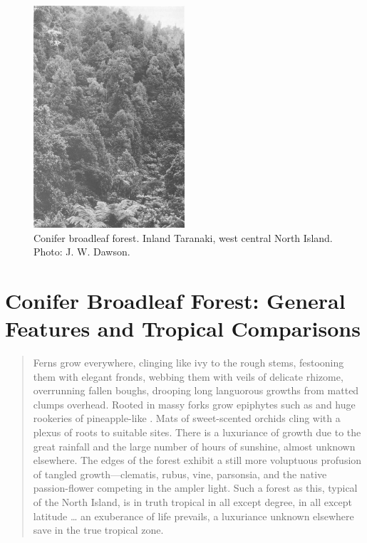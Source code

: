 \begin{figure}
	\includegraphics[width=0.5\textwidth]{graphics/figure6conifer-broadleaf.jpg}
	\centering
	\caption[Conifer broadleaf forest, inland Taranaki]{Conifer broadleaf forest.
Inland Taranaki, west central North Island.
	Photo: J. W. Dawson.}%
	\label{fig:6conifer-broadleaf}
\end{figure}

\chapter{Conifer Broadleaf Forest: General Features and Tropical Comparisons}

\begin{quote}
	Ferns grow everywhere, clinging like ivy to the rough stems, festooning them with elegant fronds, webbing them with veils of delicate rhizome, overrunning fallen boughs, drooping long languorous growths from matted clumps overhead.
Rooted in massy forks grow epiphytes such as  and huge rookeries of pineapple-like .
Mats of sweet-scented orchids cling with a plexus of roots to suitable sites.
There is a luxuriance of growth due to the great rainfall and the large number of hours of sunshine, almost unknown elsewhere.
The edges of the forest exhibit a still more voluptuous profusion of tangled growth---clematis, rubus, vine, parsonsia, and the native passion-flower competing in the ampler light.
Such a forest as this, typical of the North Island, is in truth tropical in all except degree, in all except latitude … an exuberance of life prevails, a luxuriance unknown elsewhere save in the true tropical zone.
\end{quote}

